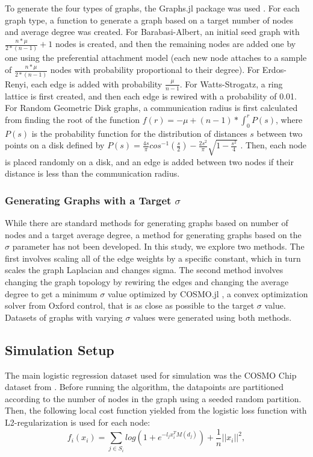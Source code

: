 \documentclass[conference]{IEEEtran}
\begin{document}
To generate the four types of graphs, the Graphs.jl package was used \autocite{Graphs2021}. For each graph type, a function to generate a graph based on a target 
number of nodes and average degree was created. For Barabasi-Albert, an initial seed graph with $\frac{n*\mu}{2*(n-1)}+1$ nodes is created, and then the remaining
nodes are added one by one using the preferential attachment model (each new node attaches to a sample of $\frac{n*\mu}{2*(n-1)}$ nodes with probability proportional to their
degree). For Erdos-Renyi, each edge is added with probability $\frac{\mu}{n-1}$. For Watts-Strogatz, a ring lattice is first created, and then each edge is rewired with a probability of 0.01. 
For Random Geometric Disk graphs, a communication radius is first calculated from finding the root of the function $f(r) = -\mu + (n-1) * \int_{0}^{r} P(s)$, where $P(s)$ is the probability function for
the distribution of distances $s$ between two points on a disk defined by $P(s) = \frac{4s}{\pi} cos^{-1}(\frac{s}{2}) - \frac{2s^2}{\pi}\sqrt{1-\frac{s^2}{4}}$ \autocite{diskLinePacking}. Then, each node is placed randomly on a disk, and an edge is added between two nodes if their distance is less than the communication radius.
\\
\subsubsection{Generating Graphs with a Target $\sigma$}
While there are standard methods for generating graphs based on number of nodes and a target average degree, a method for generating graphs based on 
the $\sigma$ parameter has not been developed. In this study, we explore two methods. The first involves scaling all of the edge weights by a specific constant, which
in turn scales the graph Laplacian and changes sigma. The second method involves changing the graph topology by rewiring the edges and changing the average degree to get a 
minimum $\sigma$ value optimized by COSMO.jl \autocite{cosmo}, a convex optimization solver from Oxford control, that is as close as possible to the target $\sigma$ value. Datasets of graphs with
varying $\sigma$ values were generated using both methods.

\subsection{Simulation Setup}

The main logistic regression dataset used for simulation was the COSMO Chip dataset from \autocite{cosmo}. Before running the algorithm, the datapoints are partitioned according to the 
number of nodes in the graph using a seeded random partition. Then, the following local cost function yielded from the logistic loss function with 
L2-regularization is used for each node: 
\begin{equation}
    f_i(x_i) = \sum_{j \in S_{i}} log(1+e^{-l_{j}x_{i}^{T}M(d_{j})}) + \frac{1}{n}||x_{i}||^{2},
\end{equation}
\end{document}
